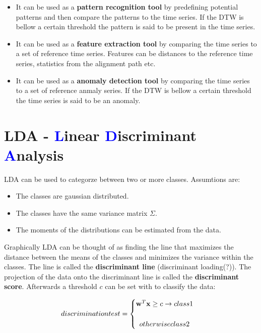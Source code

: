 \begin{itemize}
    \item It can be used as a \textbf{pattern recognition tool} by predefining potential patterns and then compare the patterns to the time series. If the DTW is bellow a certain threshold the pattern is said to be present in the time series. \newline
    \item It can be used as a \textbf{feature extraction tool} by comparing the time series to a set of reference time series. Features can be distances to the reference time series, statistics from the alignment path etc.
    \item It can be used as a \textbf{anomaly detection tool} by comparing the time series to a set of reference anmaly series. If the DTW is bellow a certain threshold the time series is said to be an anomaly. 
\end{itemize}

\section{LDA - \textcolor{blue}{L}inear \textcolor{blue}{D}iscriminant \textcolor{blue}{A}nalysis}
LDA can be used to categorze between two or more classes. Assumtions are:
\begin{itemize}
    \item The classes are gaussian distributed.
    \item The classes have the same variance matrix $\Sigma$.
    \item The moments of the distributions can be estimated from the data.
\end{itemize}
Graphically LDA can be thought of as finding the line that maximizes the distance between the means of the classes and minimizes the variance within the classes. The line is called the \textbf{discriminant line} (discriminant loading(?)). The projection of the data onto the discriminant line is called the \textbf{discriminant score}. Afterwards a threshold $c$ can be set with to classify the data:

\begin{equation}
    discrimination test = \begin{cases} 
    \mathbf{w}^T \mathbf{x} \geq c \rightarrow class 1 \\ \\
    \newline
    otherwise class 2
    \end{cases}
\end{equation}

